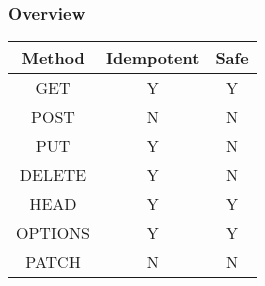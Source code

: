 \begin{frame}
    \frametitle{Overview}

    \begin{center}
        \begin{tabular}{||c c c||}
            \hline
            Method  & Idempotent & Safe \\ [0.5ex]
            \hline\hline
            GET     & Y          & Y    \\
            \hline
            POST    & N          & N    \\
            \hline
            PUT     & Y          & N    \\
            \hline
            DELETE  & Y          & N    \\
            \hline
            HEAD    & Y          & Y    \\
            \hline
            OPTIONS & Y          & Y    \\
            \hline
            PATCH   & N          & N    \\
            \hline
        \end{tabular}
    \end{center}
\end{frame}
